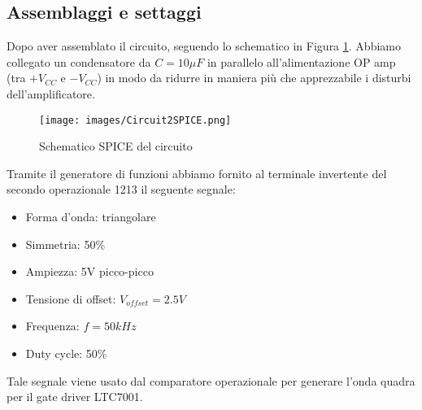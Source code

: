 \subsection{Assemblaggi e settaggi}
Dopo aver assemblato il circuito, seguendo lo schematico in Figura \ref{fig:Circuit2SPICE}. Abbiamo collegato un condensatore da $C=10\mu F$ in parallelo all'alimentazione OP amp (tra $+V_{CC}$ e $-V_{CC}$) in modo da ridurre in maniera più che apprezzabile i disturbi dell'amplificatore.
\begin{figure}[H]
    \centering
    \texttt{[image: images/Circuit2SPICE.png]}
    \caption{Schematico SPICE del circuito}
    \label{fig:Circuit2SPICE}
\end{figure}
Tramite il generatore di funzioni abbiamo fornito al terminale invertente del secondo operazionale 1213 il seguente segnale:
\begin{itemize}
    \item Forma d'onda: triangolare
    \item Simmetria: 50\%
    \item Ampiezza: 5V picco-picco
    \item Tensione di offset: $V_{offset}=2.5V$
    \item Frequenza: $f=50kHz$
    \item Duty cycle: 50\%
\end{itemize}
Tale segnale viene usato dal comparatore operazionale per generare l'onda quadra per il gate driver LTC7001.
\clearpage






